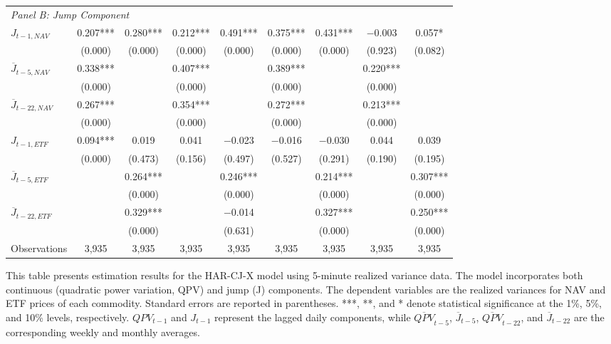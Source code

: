 \begin{landscape}
\begin{table}[htbp]
\begin{threeparttable}
\begin{tabular}{@{}lcccccccc@{}}
\multicolumn{9}{l}{\textit{Panel B: Jump Component}} \\
\addlinespace[0.1cm]
$J_{t-1,NAV}$ & 0.207*** & 0.280*** & 0.212*** & 0.491*** & 0.375*** & 0.431*** & $-$0.003 & 0.057* \\
              & (0.000) & (0.000) & (0.000) & (0.000) & (0.000) & (0.000) & (0.923) & (0.082) \\
\addlinespace[0.05cm]
$\overline{J}_{t-5,NAV}$ & 0.338*** &  & 0.407*** &  & 0.389*** &  & 0.220*** &  \\
                        & (0.000) &  & (0.000) &  & (0.000) &  & (0.000) &  \\
\addlinespace[0.05cm]
$\overline{J}_{t-22,NAV}$ & 0.267*** &  & 0.354*** &  & 0.272*** &  & 0.213*** &  \\
                         & (0.000) &  & (0.000) &  & (0.000) &  & (0.000) &  \\
\addlinespace[0.05cm]
$J_{t-1,ETF}$ & 0.094*** & 0.019 & 0.041 & $-$0.023 & $-$0.016 & $-$0.030 & 0.044 & 0.039 \\
              & (0.000) & (0.473) & (0.156) & (0.497) & (0.527) & (0.291) & (0.190) & (0.195) \\
\addlinespace[0.05cm]
$\overline{J}_{t-5,ETF}$ &  & 0.264*** &  & 0.246*** &  & 0.214*** &  & 0.307*** \\
                        &  & (0.000) &  & (0.000) &  & (0.000) &  & (0.000) \\
\addlinespace[0.05cm]
$\overline{J}_{t-22,ETF}$ &  & 0.329*** &  & $-$0.014 &  & 0.327*** &  & 0.250*** \\
                         &  & (0.000) &  & (0.631) &  & (0.000) &  & (0.000) \\
\midrule
Observations & 3,935 & 3,935 & 3,935 & 3,935 & 3,935 & 3,935 & 3,935 & 3,935 \\
\bottomrule
\end{tabular}
\begin{tablenotes}
\small
\item This table presents estimation results for the HAR-CJ-X model using 5-minute realized variance data. The model incorporates both continuous (quadratic power variation, QPV) and jump (J) components. The dependent variables are the realized variances for NAV and ETF prices of each commodity. Standard errors are reported in parentheses. ***, **, and * denote statistical significance at the 1\%, 5\%, and 10\% levels, respectively. $QPV_{t-1}$ and $J_{t-1}$ represent the lagged daily components, while $\overline{QPV}_{t-5}$, $\overline{J}_{t-5}$, $\overline{QPV}_{t-22}$, and $\overline{J}_{t-22}$ are the corresponding weekly and monthly averages.
\end{tablenotes}
\end{threeparttable}
\end{table}
\end{landscape}

